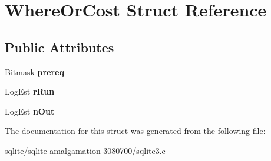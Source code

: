 \hypertarget{struct_where_or_cost}{\section{Where\+Or\+Cost Struct Reference}
\label{struct_where_or_cost}
}
\subsection*{Public Attributes}
\begin{DoxyCompactItemize}
\item 
\hypertarget{struct_where_or_cost_a42609e928af86f1783c1e579873b2b4d}{Bitmask {\bfseries prereq}}\label{struct_where_or_cost_a42609e928af86f1783c1e579873b2b4d}

\item 
\hypertarget{struct_where_or_cost_ac79c4a236da795623ec2a40592fe2617}{Log\+Est {\bfseries r\+Run}}\label{struct_where_or_cost_ac79c4a236da795623ec2a40592fe2617}

\item 
\hypertarget{struct_where_or_cost_af2305e66af19f5cc067178bcc4fb34a8}{Log\+Est {\bfseries n\+Out}}\label{struct_where_or_cost_af2305e66af19f5cc067178bcc4fb34a8}

\end{DoxyCompactItemize}


The documentation for this struct was generated from the following file\+:\begin{DoxyCompactItemize}
\item 
sqlite/sqlite-\/amalgamation-\/3080700/sqlite3.\+c\end{DoxyCompactItemize}
